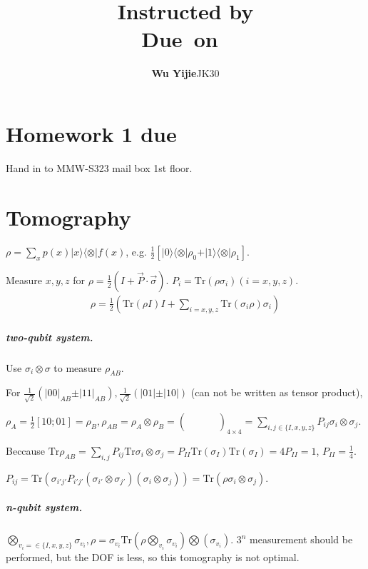 \documentclass{article}
\title{\textmd{\bf \Class\\ \Title}\\{\large Instructed by \textit{\ClassInstructor}}\\\normalsize\vspace{0.1in}\small{Due\ on\ \DueDate}}
\date{}
\newcommand{\StudentName}{Wu Yijie}
\newcommand{\StudentClass}{JK30}
\newcommand{\StudentNumber}{2013011314}
\newcommand{\Tr}{\mathrm{Tr}}
\newcommand{\ket}[1]{\vert #1\vert}
\newcommand{\ketbra}[2]{\vert #1\rangle \langle #2\vert}
\begin{document}
\begin{spacing}{1.2}
\author{\textbf{\StudentName}\qquad\StudentClass\quad\StudentNumber}
\maketitle \thispagestyle{empty}
\section{Homework 1 due}
Hand in to MMW-S323 mail box 1st floor.
\section{Tomography}
$\rho = \sum_x p(x)\ketbra{x} \otimes f(x)$, e.g. $\frac12 \left[ \ketbra{0} \otimes \rho_0 + \ketbra{1}\otimes \rho_1\right]$.

Measure $x,y,z$ for $\rho = \frac12 (I+\vec{P}\cdot\vec{\sigma})$. $P_i = \Tr(\rho\sigma_i)(i = x,y,z)$.
\begin{gather*}
\rho = \frac12 \left( \Tr(\rho I)I + \sum_{i=x,y,z}\Tr(\sigma_i \rho)\sigma_i\right)
\end{gather*}

\subparagraph{two-qubit system.}
Use $\sigma_i\otimes\sigma$ to measure $\rho_{AB}$. 

For $\frac{1}{\sqrt2}(\ket{00}_{AB}\pm \ket{11}_{AB}), \frac{1}{\sqrt2}(\ket{01}\pm\ket{10})$ (can not be written as tensor product),

$\rho_A = \frac{1}{2}[1 0; 0 1] = \rho_B, \rho_{AB} = \rho_A\otimes\rho_B = \left(\begin{array}{cccc}
&&&\\
&&&\\
&&&\\
&&&
\end{array}\right)_{4\times 4} = \sum_{i,j\in\{I,x,y,z\}}P_{ij}\sigma_i\otimes\sigma_j$.


Beccause $\Tr{\rho_{AB}} = \sum_{i,j}P_{ij}\Tr{\sigma_i\otimes\sigma_j} = P_{II}\Tr(\sigma_I)\Tr(\sigma_I) = 4P_{II}=1$, $P_{II} = \frac14$.

$P_{ij} = \Tr(\sigma_{i'j'}P_{i'j'}(\sigma_{i'}\otimes\sigma_{j'})(\sigma_i\otimes\sigma_j)) = \Tr(\rho\sigma_i\otimes\sigma_j)$.

\subparagraph{n-qubit system.}
$\bigotimes_{v_i=\in\{I,x,y,z\}} \sigma_{v_i}, \rho = \sigma_{v_i}\Tr(\rho\bigotimes_{v_i}\sigma_{v_i})\bigotimes(\sigma_{v_i}).$
$3^n$ measurement should be performed, but the DOF is less, so this tomography is not optimal. 


\end{spacing}
\end{document}
